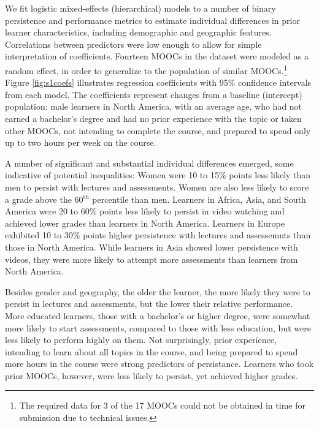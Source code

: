 \documentclass{sigchi}\usepackage[]{graphicx}\usepackage[]{color}
\begin{document}
We fit logistic mixed-effects (hierarchical) models to a number of binary persistence and performance metrics to estimate individual differences in prior learner characteristics, including demographic and geographic features. Correlations between predictors were low enough to allow for simple interpretation of coefficients. Fourteen MOOCs in the dataset were modeled as a random effect, in order to generalize to the population of similar MOOCs.\footnote{The required data for 3 of the 17 MOOCs could not be obtained in time for submission due to technical issues.} Figure \ref{fig:s1coefs} illustrates regression coefficients with 95\% confidence intervals from each model. The coefficients represent changes from a baseline (intercept) population: male learners in North America, with an average age, who had not earned a bachelor's degree and had no prior experience with the topic or taken other MOOCs, not intending to complete the course, and prepared to spend only up to two hours per week on the course.

A number of significant and substantial individual differences emerged, some indicative of potential inequalities: Women were 10 to 15\% points less likely than men to persist with lectures and assessments. Women are also less likely to score a grade above the 60$^\text{th}$ percentile than men. Learners in Africa, Asia, and South America were 20 to 60\% points less likely to persist in video watching and achieved lower grades than learners in North America. Learners in Europe exhibited 10 to 30\% points higher persistence with lectures and assessemnts than those in North America. While learners in Asia showed lower persistence with videos, they were more likely to attempt more assessments than learners from North America. 

Besides gender and geography, the older the learner, the more likely they were to persist in lectures and assessments, but the lower their relative performance. More educated learners, those with a bachelor's or higher degree, were somewhat more likely to start assessments, compared to those with less education, but were less likely to perform highly on them. Not surprisingly, prior experience, intending to learn about all topics in the course, and being prepared to spend more hours in the course were strong predictors of persistance. Learners who took prior MOOCs, however, were less likely to persist, yet achieved higher grades.
\end{document}
